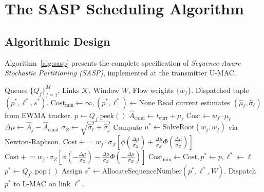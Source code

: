 \documentclass[10pt,journal,compsoc]{IEEEtran}
\begin{document}
\section{The SASP Scheduling Algorithm}
\label{sec:algorithm}

\subsection{Algorithmic Design}
Algorithm~\ref{alg:sasp} presents the complete specification of \emph{Sequence-Aware Stochastic Partitioning (SASP)}, implemented at the transmitter U-MAC.

\begin{algorithm}[t]
\caption{Sequence-Aware Stochastic Partitioning (SASP)}
\label{alg:sasp}
\begin{algorithmic}[1]
\REQUIRE Queues $\{Q_f\}_{f=1}^M$, Links $\mathcal{K}$, Window $W$, Flow weights $\{w_f\}$.
\ENSURE Dispatched tuple $(p^*, \ell^*, s^*)$.
\STATE $\text{Cost}_{\min} \leftarrow \infty, (p^*, \ell^*) \leftarrow \text{None}$
    \STATE Read current estimates $(\hat{\mu}_\ell, \hat{\sigma}_\ell)$ from EWMA tracker.
        \STATE $p \leftarrow Q_f.\text{peek}()$
        \STATE $\hat{A}_{\text{cand}} \leftarrow t_{\text{curr}} + \hat{\mu}_\ell$
        \STATE $\text{Cost} \leftarrow w_f \cdot \hat{\mu}_\ell$
            \STATE $\Delta\mu \leftarrow \hat{A}_j - \hat{A}_{\text{cand}}$
            \STATE $\sigma_Z \leftarrow \sqrt{\hat{\sigma}_\ell^2 + \hat{\sigma}_j^2}$
            \STATE Compute $u^* \leftarrow \text{SolveRoot}(w_j, w_f)$ via Newton-Raphson.
                \STATE $\text{Cost} \mathrel{+}= w_f \cdot \sigma_Z \left[ \phi(\frac{\Delta\mu}{\sigma_Z}) + \frac{\Delta\mu}{\sigma_Z} \Phi(\frac{\Delta\mu}{\sigma_Z}) \right]$
            \ELSE
                \STATE $\text{Cost} \mathrel{+}= w_j \cdot \sigma_Z \left[ \phi(-\frac{\Delta\mu}{\sigma_Z}) - \frac{\Delta\mu}{\sigma_Z} \Phi(-\frac{\Delta\mu}{\sigma_Z}) \right]$
            \ENDIF
        \ENDFOR
            \STATE $\text{Cost}_{\min} \leftarrow \text{Cost}, p^* \leftarrow p, \ell^* \leftarrow \ell$
        \ENDIF
    \ENDFOR
\ENDFOR
\STATE $p^* \leftarrow Q_{f^*}.\text{pop}()$
\STATE Assign $s^* \leftarrow \text{AllocateSequenceNumber}(p^*, \ell^*, W)$.
\STATE Dispatch $p^*$ to L-MAC on link $\ell^*$.
\end{algorithmic}
\end{algorithm}
\end{document}
